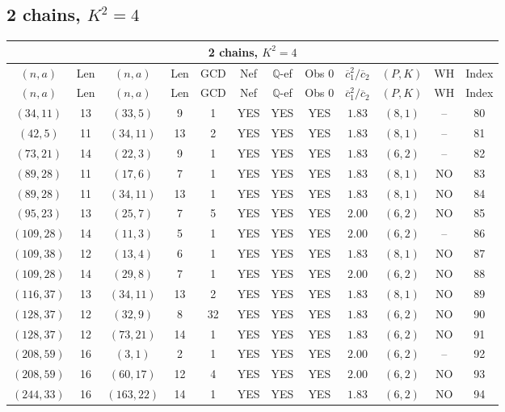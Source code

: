 \subsection{2 chains, $K^2 = 4$}
\begin{longtable}{|c|c|c|c|c|c|c|c|c|c|c|c|}
\hline
\multicolumn{12}{|c|}{2 chains, $K^2 = 4$}\\
\hline
$(n,a)$ & Len & $(n,a)$ & Len & GCD & Nef & $\mathbb Q$-ef & Obs 0 & $\overline c_1^2 / \overline c_2$ & $(P,K)$ & WH & Index\\
\hline
\endfirsthead

\hline
$(n,a)$ & Len & $(n,a)$ & Len & GCD & Nef & $\mathbb Q$-ef & Obs 0 & $\overline c_1^2 / \overline c_2$ & $(P,K)$ & WH & Index\\
\hline
\endhead
\hline
\endfoot

$(34,11)$ & 13 & $(33,5)$ & 9 & 1 & YES & YES & YES & $1.83$ & $(8,1)$ & -- & 80\\
$(42,5)$ & 11 & $(34,11)$ & 13 & 2 & YES & YES & YES & $1.83$ & $(8,1)$ & -- & 81\\
$(73,21)$ & 14 & $(22,3)$ & 9 & 1 & YES & YES & YES & $1.83$ & $(6,2)$ & -- & 82\\
$(89,28)$ & 11 & $(17,6)$ & 7 & 1 & YES & YES & YES & $1.83$ & $(8,1)$ & NO & 83\\
$(89,28)$ & 11 & $(34,11)$ & 13 & 1 & YES & YES & YES & $1.83$ & $(8,1)$ & NO & 84\\
$(95,23)$ & 13 & $(25,7)$ & 7 & 5 & YES & YES & YES & $2.00$ & $(6,2)$ & NO & 85\\
$(109,28)$ & 14 & $(11,3)$ & 5 & 1 & YES & YES & YES & $2.00$ & $(6,2)$ & -- & 86\\
$(109,38)$ & 12 & $(13,4)$ & 6 & 1 & YES & YES & YES & $1.83$ & $(8,1)$ & NO & 87\\
$(109,28)$ & 14 & $(29,8)$ & 7 & 1 & YES & YES & YES & $2.00$ & $(6,2)$ & NO & 88\\
$(116,37)$ & 13 & $(34,11)$ & 13 & 2 & YES & YES & YES & $1.83$ & $(8,1)$ & NO & 89\\
$(128,37)$ & 12 & $(32,9)$ & 8 & 32 & YES & YES & YES & $1.83$ & $(6,2)$ & NO & 90\\
$(128,37)$ & 12 & $(73,21)$ & 14 & 1 & YES & YES & YES & $1.83$ & $(6,2)$ & NO & 91\\
$(208,59)$ & 16 & $(3,1)$ & 2 & 1 & YES & YES & YES & $2.00$ & $(6,2)$ & -- & 92\\
$(208,59)$ & 16 & $(60,17)$ & 12 & 4 & YES & YES & YES & $2.00$ & $(6,2)$ & NO & 93\\
$(244,33)$ & 16 & $(163,22)$ & 14 & 1 & YES & YES & YES & $1.83$ & $(6,2)$ & NO & 94\\

\end{longtable}
